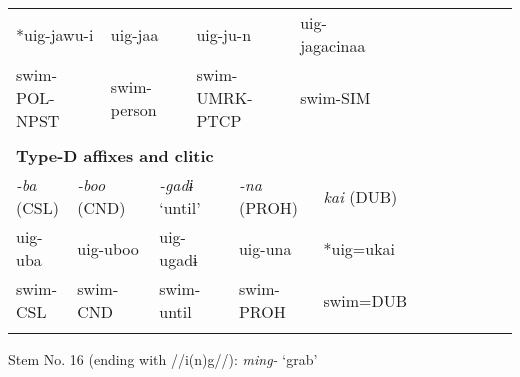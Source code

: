 \begin{tabularx}{\textwidth}{XXXXXXXXXXXXXXXXXXXX}
\multicolumn{3}{X}{{ *uig-jawu-i}} & \multicolumn{2}{X}{{ uig-jaa}} & \multicolumn{3}{X}{uig-ju-n} & \multicolumn{4}{X}{{ uig-jagacinaa}} & \multicolumn{8}{X}{}\\
\multicolumn{3}{X}{swim-POL-NPST} & \multicolumn{2}{X}{swim-person} & \multicolumn{3}{X}{swim-UMRK-PTCP} & \multicolumn{4}{X}{swim-SIM} & \multicolumn{8}{X}{}\\
\multicolumn{20}{X}{}\\
\multicolumn{20}{X}{{\bfseries Type-D affixes and clitic}}\\
\multicolumn{2}{X}{{ \textit{{}-ba} (CSL)}} & \multicolumn{2}{X}{{ \textit{{}-boo} (CND)}} & \multicolumn{2}{X}{{ \textit{{}-gadɨ} ‘until’}} & \multicolumn{3}{X}{{ \textit{{}-na} (PROH)}} & \multicolumn{5}{X}{{ \textit{kai} (DUB)}} & \multicolumn{6}{X}{}\\
\multicolumn{2}{X}{{ uig-uba}} & \multicolumn{2}{X}{{ uig-uboo}} & \multicolumn{2}{X}{{ uig-ugadɨ}} & \multicolumn{3}{X}{{ uig-una}} & \multicolumn{5}{X}{{ *uig=ukai}} & \multicolumn{6}{X}{}\\
\multicolumn{2}{X}{swim-CSL} & \multicolumn{2}{X}{swim-CND} & \multicolumn{2}{X}{swim-until} & \multicolumn{3}{X}{swim-PROH} & \multicolumn{5}{X}{swim=DUB} & \multicolumn{6}{X}{}\\
\lspbottomrule
\end{tabularx}
Stem No. 16 (ending with //i(n)g//): \textit{ming-} ‘grab’

\tablefirsthead{}

